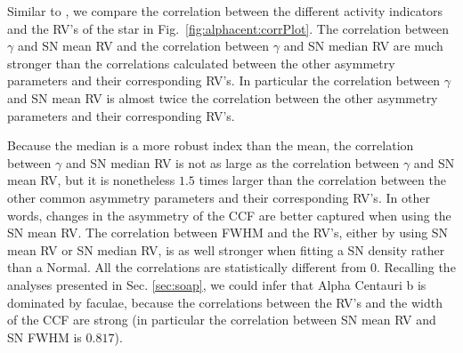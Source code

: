 \documentclass[11pt, oneside]{article}
\begin{document}
Similar to \citet{Figueira-2013}, we compare the correlation between the different activity indicators and the RV's of the star in Fig.~\ref{fig:alphacent:corrPlot}. The correlation between $\gamma$ and SN mean RV and the correlation between $\gamma$ and SN median RV are much stronger than the correlations calculated between the other asymmetry parameters and their corresponding RV's. In particular the correlation between $\gamma$ and SN mean RV is almost twice the correlation between the other asymmetry parameters and their corresponding RV's.

Because the median is a more robust index than the mean, the correlation between $\gamma$ and SN median RV is not as large as the correlation between $\gamma$ and SN mean RV, but it is nonetheless $1.5$ times larger than the correlation between the other common asymmetry parameters and their corresponding RV's. In other words, changes in the asymmetry of the CCF are better captured when using the SN mean RV. The correlation between FWHM and the RV's, either by using SN mean RV or SN median RV, is as well stronger when fitting a SN density rather than a Normal. All the correlations are statistically different from $0$. Recalling the analyses presented in Sec. \ref{sec:soap}, we could infer that Alpha Centauri b is dominated by faculae, because the correlations between the RV's and the width of the CCF are strong (in particular the correlation between SN mean RV and SN FWHM is $0.817$).
%
\end{document}
